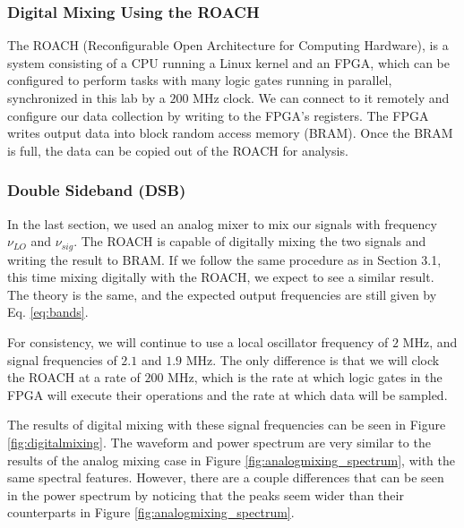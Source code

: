 \documentclass[12pt]{article}
\begin{document}
\subsubsection{Digital Mixing Using the ROACH}
The ROACH (Reconfigurable Open Architecture for Computing Hardware), is a system consisting of a CPU running a Linux kernel and an FPGA, which can be configured to perform tasks with many logic gates running in parallel, synchronized in this lab by a $200$ MHz clock. We can connect to it remotely and configure our data collection by writing to the FPGA's registers. The FPGA writes output data into block random access memory (BRAM). Once the BRAM is full, the data can be copied out of the ROACH for analysis.

\subsubsection{Double Sideband (DSB)}
In the last section, we used an analog mixer to mix our signals with frequency $\nu_{LO}$ and $\nu_{sig}$. The ROACH is capable of digitally mixing the two signals and writing the result to BRAM. If we follow the same procedure as in Section 3.1, this time mixing digitally with the ROACH, we expect to see a similar result. The theory is the same, and the expected output frequencies are still given by Eq. \ref{eq:bands}.

For consistency, we will continue to use a local oscillator frequency of $2$ MHz, and signal frequencies of $2.1$ and $1.9$ MHz. The only difference is that we will clock the ROACH at a rate of $200$ MHz, which is the rate at which logic gates in the FPGA will execute their operations and the rate at which data will be sampled.

The results of digital mixing with these signal frequencies can be seen in Figure \ref{fig:digitalmixing}. The waveform and power spectrum are very similar to the results of the analog mixing case in Figure \ref{fig:analogmixing_spectrum}, with the same spectral features. However, there are a couple differences that can be seen in the power spectrum by noticing that the peaks seem wider than their counterparts in Figure \ref{fig:analogmixing_spectrum}.
\end{document}
